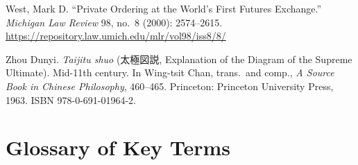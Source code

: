 \documentclass[10pt, openany]{book}
\newcommand{\jp}[1]{{\japanesefont #1}}
\begin{document}
\begin{description}[style=nextline, leftmargin=0em, font=\normalfont]
\item West, Mark D. ``Private Ordering at the World's First Futures
  Exchange.'' \textit{Michigan Law Review} 98, no.~8 (2000): 2574--2615.
  \url{https://repository.law.umich.edu/mlr/vol98/iss8/8/}

\item Zhou Dunyi. \textit{Taijitu shuo} (\jp{太極図説}, Explanation of the
  Diagram of the Supreme Ultimate). Mid-11th century. In Wing-tsit Chan,
  trans.\ and comp., \textit{A Source Book in Chinese Philosophy}, 460--465.
  Princeton: Princeton University Press, 1963.
  ISBN 978-0-691-01964-2.

\end{description}

\chapter*{Glossary of Key Terms}
\end{document}
